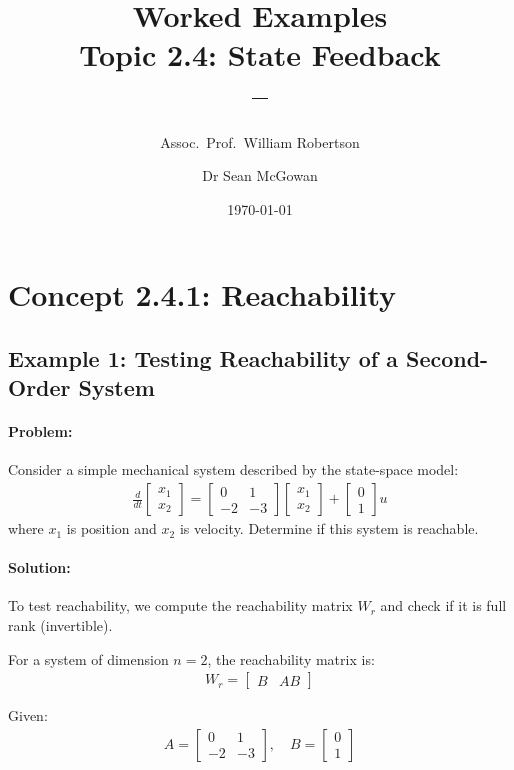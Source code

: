 \documentclass[11pt,a4paper]{article}
\title{\textbf{Worked Examples}\\[0.5em]
\large Topic 2.4: State Feedback\\[0.3em]
\normalsize \coursesubtitle{} -- \coursetitle}
\author{Assoc.\ Prof.\ William Robertson \and Dr Sean McGowan}
\date{\today}
\begin{document}
\maketitle
\tableofcontents
\newpage

\section{Concept 2.4.1: Reachability}

\subsection{Example 1: Testing Reachability of a Second-Order System}

\paragraph{Problem:} Consider a simple mechanical system described by the state-space model:
\begin{align}
\frac{d}{dt}\begin{bmatrix} x_1 \\ x_2 \end{bmatrix} = \begin{bmatrix} 0 & 1 \\ -2 & -3 \end{bmatrix}\begin{bmatrix} x_1 \\ x_2 \end{bmatrix} + \begin{bmatrix} 0 \\ 1 \end{bmatrix}u
\end{align}
where $x_1$ is position and $x_2$ is velocity. Determine if this system is reachable.

\paragraph{Solution:} 

To test reachability, we compute the reachability matrix $W_r$ and check if it is full rank (invertible).

For a system of dimension $n=2$, the reachability matrix is:
\begin{align}
W_r = \begin{bmatrix} B & AB \end{bmatrix}
\end{align}

Given:
\begin{align}
A = \begin{bmatrix} 0 & 1 \\ -2 & -3 \end{bmatrix}, \quad B = \begin{bmatrix} 0 \\ 1 \end{bmatrix}
\end{align}
\end{document}
